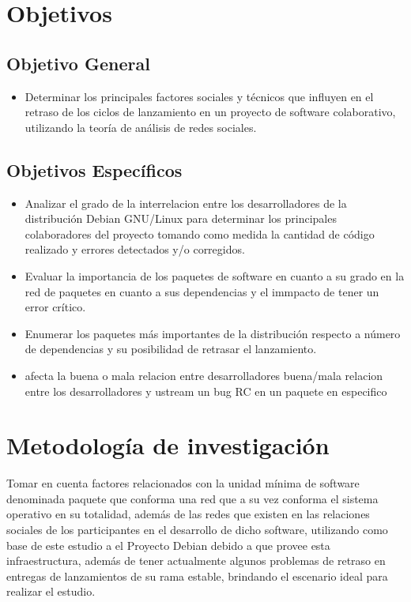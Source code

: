 \documentclass[12pt,titlepage]{report}
\begin{document}
\section{Objetivos}  %
\subsection{Objetivo General}
\begin{itemize}
\item  Determinar los  principales  factores sociales  y técnicos  que
influyen en el retraso de los  ciclos de lanzamiento en un proyecto de
software  colaborativo,  utilizando la  teoría  de  análisis de  redes
sociales.
\end{itemize}

\subsection{Objetivos Específicos}
\begin{itemize}
\item Analizar el grado de  la interrelacion entre los desarrolladores
de la  distribución Debian  GNU/Linux para determinar  los principales
colaboradores del proyecto  tomando como medida la  cantidad de código
realizado y errores detectados y/o corregidos.
\item Evaluar la  importancia de los paquetes de software  en cuanto a
su grado  en la  red de  paquetes en  cuanto a  sus dependencias  y el
immpacto de tener un error crítico.
\item  Enumerar  los  paquetes  más  importantes  de  la  distribución
respecto  a número  de dependencias  y su  posibilidad de  retrasar el
lanzamiento.
\item %
afecta la buena o mala  relacion entre desarrolladores %
buena/mala relacion  entre los desarrolladores y  ustream %
un bug RC en un paquete en especifico
\end{itemize}

\section{Metodología de investigación} %
Tomar en  cuenta  factores  relacionados con  la  unidad  mínima  de
software denominada paquete que conforma una red que a su vez conforma
el sistema operativo en su totalidad,  además de las redes que existen
en las  relaciones sociales de  los participantes en el  desarrollo de
dicho software,  utilizando como  base de este  estudio a  el Proyecto
Debian  debido a  que  provee esta  infraestructura,  además de  tener
actualmente algunos  problemas de retraso en  entregas de lanzamientos
de  su rama  estable, brindando  el escenario  ideal para  realizar el
estudio.
\end{document}
